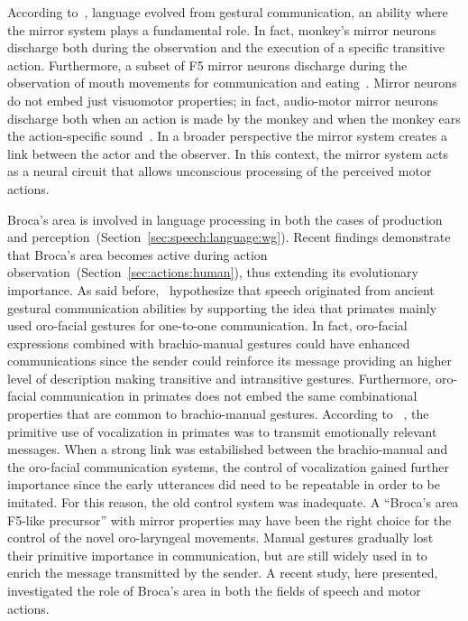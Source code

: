 According to~\citet{rizzolatti.arbib:1998}, language evolved from gestural
communication, an ability where the mirror system plays a fundamental role.
In fact, monkey's mirror neurons discharge both during the observation and the
execution of a specific transitive action.
Furthermore, a subset of F5 mirror neurons discharge during the
observation of mouth movements for communication and
eating~\citep{ferrari.etal:2003}. 
Mirror neurons do not embed just visuomotor properties; in fact, audio-motor
mirror neurons discharge both when an action is made by the monkey and when the
monkey ears the action-specific sound~\citep{kohler.etal:2002}.
In a broader perspective the mirror system creates a link between the actor and 
the observer.
In this context, the mirror system acts as a neural circuit that allows
unconscious processing of the perceived motor actions.

Broca's area is involved in language processing in both the cases of production
and perception~(Section~\ref{sec:speech:language:wg}).
Recent findings demonstrate that Broca's area becomes active
during action observation~(Section~\ref{sec:actions:human}), thus extending its
evolutionary importance.
As said before,~\citet{rizzolatti.arbib:1998} hypothesize that
speech originated from ancient gestural communication abilities by supporting
the idea that primates mainly used oro-facial gestures for one-to-one 
communication. 
In fact, oro-facial expressions combined with brachio-manual gestures
could have enhanced communications since the sender could reinforce its message
providing an higher level of description making transitive and intransitive
gestures.
Furthermore, oro-facial communication in primates does not embed the same
combinational properties that are common to brachio-manual gestures.
According to ~\citet{rizzolatti.arbib:1998}, the primitive use of vocalization
in
primates was to transmit emotionally relevant messages.
When a strong link was estabilished between the brachio-manual and the
oro-facial 
communication systems, the control of vocalization gained further importance
since the early utterances did need to be repeatable in order to be imitated.
For this reason, the old control system was inadequate.
A ``Broca's area F5-like precursor'' with mirror properties may have been the
right choice for the control of the novel oro-laryngeal movements.
Manual gestures gradually lost their primitive importance in communication, but 
are still widely used in to enrich the message transmitted by the sender.
A recent study, here presented, investigated the role of Broca's area in both
the fields of speech and motor actions.


